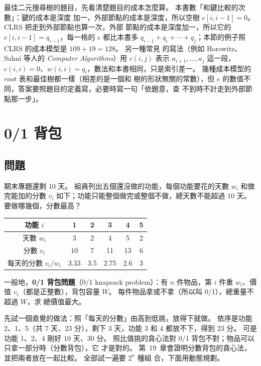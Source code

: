 \begin{examnote}
最佳二元搜尋樹的題目，先看清楚題目的成本怎麼算。 本書數「和鍵比較的次數」：鍵的成本是深度
加一，外部節點的成本是深度，所以空樹 $e[i, i-1] = 0$。 CLRS 把走到外部節點也算一次，外部
節點的成本是深度加一，所以它的 $e[i, i-1] = q_{i-1}$，每一格的 $e$ 都比本書多
$q_{i-1} + q_i + \cdots + q_j$；本節的例子照 CLRS 的成本模型是 $109 + 19 = 128$。 另一種常見
的寫法（例如 Horowitz、Sahni 等人的 \textit{Computer Algorithms}）用 $c(i, j)$ 表示
$a_{i+1}, \ldots, a_j$ 這一段，$c(i, i) = 0$、$w(i, i) = q_i$，數法和本書相同，只是索引差一。 幾種成本模型的 $\mathit{root}$ 表和最佳樹都一樣（相差的是一個和
樹的形狀無關的常數），但 $e$ 的數值不同，答案要照題目的定義寫，必要時寫一句「依題意，查
不到時不計走到外部節點那一步」。
\end{examnote}

\section{0/1 背包}
\label{sec:dp-knapsack}

\subsection{問題}

期末專題還剩 $10$ 天。 組員列出五個還沒做的功能，每個功能要花的天數 $w_i$ 和做完能加的分數
$v_i$ 如下；功能只能整個做完或整個不做，總天數不能超過 $10$ 天。 要做哪幾個，分數最高？

\begin{center}
\begin{tabular}{c*{5}{c}}
\toprule
功能 $i$ & 1 & 2 & 3 & 4 & 5 \\
\midrule
天數 $w_i$ & 3 & 2 & 4 & 5 & 2 \\
分數 $v_i$ & 10 & 7 & 11 & 13 & 6 \\
每天的分數 $v_i / w_i$ & 3.33 & 3.5 & 2.75 & 2.6 & 3 \\
\bottomrule
\end{tabular}
\end{center}

一般地，\textbf{0/1 背包問題}（0/1 knapsack problem）：有 $n$ 件物品，第 $i$ 件重 $w_i$、價值
$v_i$（都是正整數），背包容量 $W$。 每件物品拿或不拿（所以叫 0/1），總重量不超過 $W$，求
總價值最大。

先試一個直覺的做法：照「每天的分數」由高到低挑，放得下就做。 依序是功能 2、1、5（共 $7$
天、$23$ 分），剩下 $3$ 天，功能 3 和 4 都放不下，得到 $23$ 分。 可是功能 1、2、4 剛好
$10$ 天、$30$ 分。 照比值挑的貪心法對 0/1 背包不對；物品可以只拿一部分時（分數背包），它
才是對的。 第~19~章會證明分數背包的貪心法，並把兩者放在一起比較。 全部試一遍要 $2^n$ 種組
合，下面用動態規劃。

